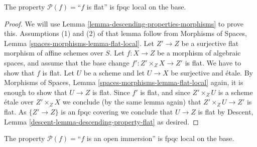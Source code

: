 \begin{lemma}
\label{lemma-descending-property-flat}
The property $\mathcal{P}(f) =$``$f$ is flat''
is fpqc local on the base.
\end{lemma}

\begin{proof}
We will use
Lemma \ref{lemma-descending-properties-morphisms}
to prove this. Assumptions (1) and (2) of that lemma follow from
Morphisms of Spaces,
Lemma \ref{spaces-morphisms-lemma-flat-local}.
Let $Z' \to Z$ be a surjective flat morphism of affine schemes over $S$.
Let $f : X \to Z$ be a morphism of algebraic spaces, and assume
that the base change $f' : Z' \times_Z X \to Z'$ is flat.
We have to show that $f$ is flat. Let $U$ be a scheme
and let $U \to X$ be surjective and \'etale. By
Morphisms of Spaces,
Lemma \ref{spaces-morphisms-lemma-flat-local}
again, it is enough to show that $U \to Z$ is flat.
Since $f'$ is flat, and since $Z' \times_Z U$ is a
scheme \'etale over $Z' \times_Z X$ we conclude (by the same lemma again) that
$Z' \times_Z U \to Z'$ is flat.
As $\{Z' \to Z\}$ is an fpqc covering we conclude that
$U \to Z$ is flat by
Descent, Lemma \ref{descent-lemma-descending-property-flat}
as desired.
\end{proof}

\begin{lemma}
\label{lemma-descending-property-open-immersion}
The property $\mathcal{P}(f) =$``$f$ is an open immersion''
is fpqc local on the base.
\end{lemma}

